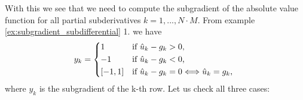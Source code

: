         With this we see that we need to compute the subgradient of the absolute value function for all partial subderivatives $k = 1, ..., N \cdot M$. From example \ref{ex:subgradient_subdifferential} 1. we have
            $$
                y_{k} =
                    \begin{dcases*}
                        1 & \textnormal{if $\hat{u}_{k} - g_{k} > 0$,} \\
                        -1 & \textnormal{if $\hat{u}_{k} - g_{k} < 0$,} \\
                        [-1, 1] & \textnormal{if $\hat{u}_{k} - g_{k} = 0 \Longleftrightarrow \hat{u}_{k} = g_{k}$,}
                    \end{dcases*}
            $$
        where $y_{k}$ is the subgradient of the k-th row. Let us check all three cases:
